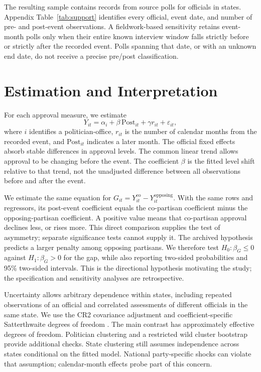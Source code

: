 \documentclass[11pt]{article}
\begin{document}
The resulting sample contains \CountMainRows{} records from \CountMainPolls{} source polls for \CountMainPoliticians{} officials in \CountMainStates{} states. Appendix Table~\ref{tab:support} identifies every official, event date, and number of pre- and post-event observations. A fieldwork-based sensitivity retains event-month polls only when their entire known interview window falls strictly before or strictly after the recorded event. Polls spanning that date, or with an unknown end date, do not receive a precise pre/post classification.

\section{Estimation and Interpretation}

For each approval measure, we estimate
\begin{equation}
Y_{it}=\alpha_i+\beta\,\mathrm{Post}_{it}+\gamma r_{it}+\varepsilon_{it},
\label{eq:model}
\end{equation}
where $i$ identifies a politician-office, $r_{it}$ is the number of calendar months from the recorded event, and $\mathrm{Post}_{it}$ indicates a later month. The official fixed effects absorb stable differences in approval levels. The common linear trend allows approval to be changing before the event. The coefficient $\beta$ is the fitted level shift relative to that trend, not the unadjusted difference between all observations before and after the event.

We estimate the same equation for $G_{it}=Y^{\mathrm{co}}_{it}-Y^{\mathrm{opposing}}_{it}$. With the same rows and regressors, its post-event coefficient equals the co-partisan coefficient minus the opposing-partisan coefficient. A positive value means that co-partisan approval declines less, or rises more. This direct comparison supplies the test of asymmetry; separate significance tests cannot supply it. The archived hypothesis predicts a larger penalty among opposing partisans. We therefore test $H_0:\beta_G\leq 0$ against $H_1:\beta_G>0$ for the gap, while also reporting two-sided probabilities and 95\% two-sided intervals. This is the directional hypothesis motivating the study; the specification and sensitivity analyses are retrospective.

Uncertainty allows arbitrary dependence within states, including repeated observations of an official and correlated assessments of different officials in the same state. We use the CR2 covariance adjustment and coefficient-specific Satterthwaite degrees of freedom \citep{pustejovsky2018}. The main contrast has approximately \GapDf{} effective degrees of freedom. Politician clustering and a restricted wild cluster bootstrap provide additional checks. State clustering still assumes independence across states conditional on the fitted model. National party-specific shocks can violate that assumption; calendar-month effects probe part of this concern.
\end{document}
